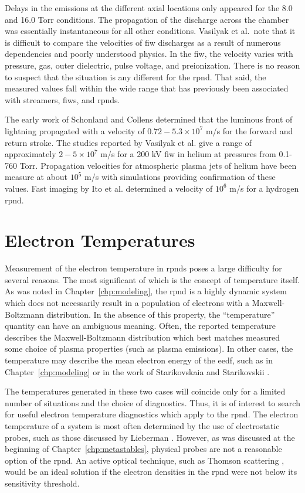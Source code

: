 Delays in the emissions at the different axial locations only appeared for the
8.0 and 16.0 Torr conditions. The propagation of the discharge across the
chamber was essentially instantaneous for all other conditions. Vasilyak et al.\
note that it is difficult to compare the velocities of \acs{fiw} discharges as a
result of numerous dependencies and poorly understood physics. In the \acs{fiw},
the velocity varies with pressure, gas, outer dielectric, pulse voltage, and
preionization. There is no reason to suspect that the situation is any different
for the \acs{rpnd}. That said, the measured values fall within the wide range
that has previously been associated with streamers, \acs{fiw}s, and \acs{rpnd}s.

The early work of Schonland and Collens \cite{Schonland1933} determined that the
luminous front of lightning propagated with a velocity of $0.72-5.3\times10^7$
m/s for the forward and return stroke. The studies reported by Vasilyak et al.
\cite{Vasilyak1994} give a range of approximately $2-5\times10^7$ m/s for a 200
kV \acs{fiw} in helium at pressures from 0.1-760 Torr. Propagation velocities
for atmospheric plasma jets of helium have been measure at about $10^5$ m/s
\cite{Lu2006} with simulations providing confirmation \cite{Naidis2010} of these
values. Fast imaging by Ito et al. \cite{Ito2010} determined a velocity of
$10^6$ m/s for a hydrogen \acs{rpnd}.


\section{Electron Temperatures}

Measurement of the electron temperature in \acs{rpnd}s poses a large difficulty
for several reasons. The most significant of which is the concept of temperature
itself. As was noted in Chapter~\ref{chp:modeling}, the \acs{rpnd} is a highly
dynamic system which does not necessarily result in a population of electrons
with a Maxwell-Boltzmann distribution. In the absence of this property, the
``temperature'' quantity can have an ambiguous meaning. Often, the reported
temperature describes the Maxwell-Boltzmann distribution which best matches
measured some choice of plasma properties (such as plasma emissions). In other
cases, the temperature may describe the mean electron energy of the \acs{eedf},
such as in Chapter~\ref{chp:modeling} or in the work of Starikovskaia and
Starikovskii \cite{Starikovskaia2001}.

The temperatures generated in these two cases will coincide only for a limited
number of situations and the choice of diagnostics. Thus, it is of interest to
search for useful electron temperature diagnostics which apply to the
\acs{rpnd}. The electron temperature of a system is most often determined by the
use of electrostatic probes, such as those discussed by Lieberman
\cite{Lieberman2005}. However, as was discussed at the beginning of
Chapter~\ref{chp:metastables}, physical probes are not a reasonable option of
the \acs{rpnd}. An active optical technique, such as Thomson scattering
\cite{VanGessel2012}, would be an ideal solution if the electron densities in
the \acs{rpnd} were not below its sensitivity threshold.


